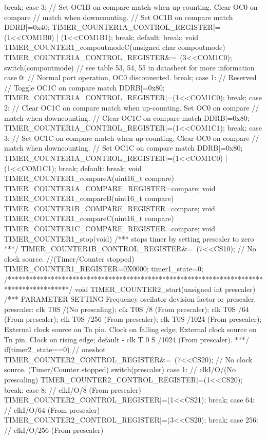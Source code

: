 \begin{verbatimtab}
{{		break;
		case 3: // Set OC1B on compare match when up-counting. Clear OC0 on compare
		// match when downcounting.
		// Set OC1B on compare match
		DDRB|=0x40;
		TIMER_COUNTER1A_CONTROL_REGISTER|=(1<<COM1B0) | (1<<COM1B1);
		break;
		default:
		break;
	}
}
void TIMER_COUNTER1_compoutmodeC(unsigned char compoutmode)
{
	TIMER_COUNTER1A_CONTROL_REGISTER&=~(3<<COM1C0);
	switch(compoutmode){ // see table 53, 54, 55 in datasheet for more information
		case 0: // Normal port operation, OC0 disconnected.
		break;
		case 1: // Reserved
		// Toggle OC1C on compare match
		DDRB|=0x80;
		TIMER_COUNTER1A_CONTROL_REGISTER|=(1<<COM1C0);
		break;
		case 2: // Clear OC1C on compare match when up-counting. Set OC0 on compare
		// match when downcounting.
		// Clear OC1C on compare match
		DDRB|=0x80;
		TIMER_COUNTER1A_CONTROL_REGISTER|=(1<<COM1C1);
		break;
		case 3: // Set OC1C on compare match when up-counting. Clear OC0 on compare
		// match when downcounting.
		// Set OC1C on compare match
		DDRB|=0x80;
		TIMER_COUNTER1A_CONTROL_REGISTER|=(1<<COM1C0) | (1<<COM1C1);
		break;
		default:
		break;
	}
}
void TIMER_COUNTER1_compareA(uint16_t compare)
{
	TIMER_COUNTER1A_COMPARE_REGISTER=compare;
}
void TIMER_COUNTER1_compareB(uint16_t compare)
{
	TIMER_COUNTER1B_COMPARE_REGISTER=compare;
}
void TIMER_COUNTER1_compareC(uint16_t compare)
{
	TIMER_COUNTER1C_COMPARE_REGISTER=compare;
}
void TIMER_COUNTER1_stop(void)
/***
stops timer by setting prescaler to zero
***/
{
	TIMER_COUNTER1B_CONTROL_REGISTER&=~(7<<CS10); // No clock source.
	//(Timer/Counter stopped)
	TIMER_COUNTER1_REGISTER=0X0000;
	timer1_state=0;
}
/*****************************************************************************************/
void TIMER_COUNTER2_start(unsigned int prescaler)
/***
PARAMETER SETTING
Frequency oscilator devision factor or prescaler.
prescaler: clk T0S /(No prescaling); clk T0S /8 (From prescaler);
clk T0S /64 (From prescaler);
clk T0S /256 (From prescaler); clk T0S /1024 (From prescaler);
External clock source on Tn pin. Clock on falling edge;
External clock source on Tn pin. Clock on rising edge;
default - clk T 0 S /1024 (From prescaler).
***/
{
	if(timer2_state==0){ // oneshot
		TIMER_COUNTER2_CONTROL_REGISTER&=~(7<<CS20);
		// No clock source. (Timer/Counter stopped)
		switch(prescaler){
			case 1: // clkI/O/(No prescaling)
			TIMER_COUNTER2_CONTROL_REGISTER|=(1<<CS20);
			break;
			case 8: // clkI/O/8 (From prescaler)
			TIMER_COUNTER2_CONTROL_REGISTER|=(1<<CS21);
			break;
			case 64: // clkI/O/64 (From prescaler)
			TIMER_COUNTER2_CONTROL_REGISTER|=(3<<CS20);
			break;
			case 256: // clkI/O/256 (From prescaler)
}}}
\end{verbatimtab}
